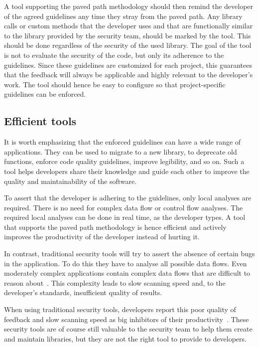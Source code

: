 A tool supporting the paved path methodology should then remind the developer of the agreed guidelines any time they stray from the paved path.
Any library calls or custom methods that the developer uses and that are functionally similar to the library provided by the security team, should be marked by the tool.
This should be done regardless of the security of the used library. The goal of the tool is not to evaluate the security of the code, but only its adherence to the guidelines.
Since these guidelines are customized for each project, this guarantees that the feedback will always be applicable and highly relevant to the developer's work.
The tool should hence be easy to configure so that project-specific guidelines can be enforced.

\subsection{Efficient tools}
It is worth emphasizing that the enforced guidelines can have a wide range of applications. They can be used to migrate to a new library, to deprecate old functions, enforce code quality guidelines, improve legibility, and so on. 
Such a tool helps developers share their knowledge and guide each other to improve the quality and maintainability of the software. 

To assert that the developer is adhering to the guidelines, only local analyses are required. There is no need for complex data flow or control flow analyses. The required local analyses can be done in real time, as the developer types. 
A tool that supports the paved path methodology is hence efficient and actively improves the productivity of the developer instead of hurting it.

In contrast, traditional security tools will try to assert the absence of certain bugs in the application. To do this they have to analyse all possible data flows. Even moderately complex applications contain complex data flows that are difficult to reason about~\cite{kern2014securing}. This complexity leads to slow scanning speed and, to the developer's standards, insufficient quality of results. 

When using traditional security tools, developers report this poor quality of feedback and slow scanning speed as big inhibitors of their productivity~\cite{shiftleftsurvey}.
These security tools are of course still valuable to the security team to help them create and maintain libraries, but they are not the right tool to provide to developers.

